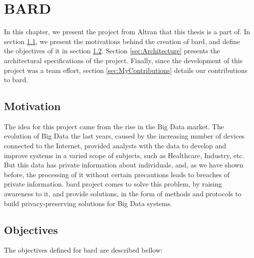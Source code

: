%

\acresetall

\chapter{BARD}
\label{ch:BARD}


In this chapter, we present the project from Altran that this thesis is a part of. 
In section \ref{sec:Motivation}, we present the motivations behind the creation of \ac{bard}, and define the objectives of it in section \ref{sec:Objectives}.
Section \ref{sec:Architecture} presents the architectural specifications of the project.
Finally, since the development of this project was a team effort, section \ref{sec:MyContributions} details our contributions to \ac{bard}.



\section{Motivation}
\label{sec:Motivation}

The idea for this project came from the rise in the Big Data market. The evolution of Big Data the last years, caused by the increasing number of devices connected to the Internet, provided analysts with the data to develop and improve systems in a varied scope of subjects, such as Healthcare, Industry, etc. But this data has private information about individuals, and, as we have shown before, the processing of it without certain precautions leads to breaches of private information. \ac{bard} project comes to solve this problem, by raising awareness to it, and provide solutions, in the form of methods and protocols to build privacy-preserving solutions for Big Data systems.

\section{Objectives}
\label{sec:Objectives}

The objectives defined for \ac{bard} are described bellow:

